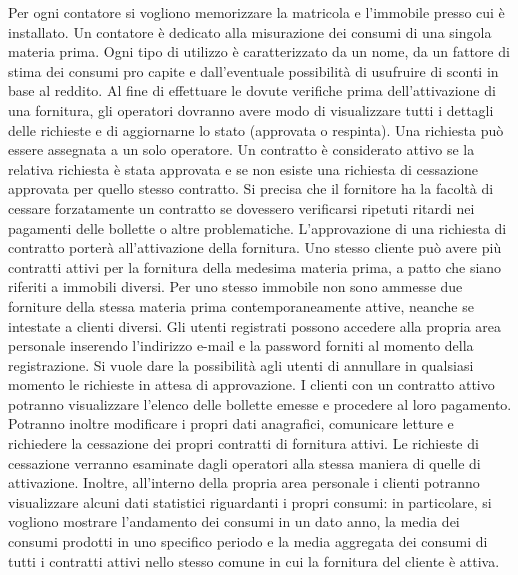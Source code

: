 \documentclass[a4paper,12pt]{report}
\begin{document}
\begin{mdframed}
\newline
Per ogni contatore si vogliono memorizzare la matricola e l'immobile presso cui è installato. Un contatore è dedicato alla misurazione dei consumi di una singola materia prima.
\newline
Ogni tipo di utilizzo è caratterizzato da un nome, da un fattore di stima dei consumi pro capite e dall'eventuale possibilità di usufruire di sconti in base al reddito.
\newline
Al fine di effettuare le dovute verifiche prima dell'attivazione di una fornitura, gli operatori dovranno avere modo di visualizzare tutti i dettagli delle richieste e di aggiornarne lo stato (approvata o respinta). Una richiesta può essere assegnata a un solo operatore. Un contratto è considerato attivo se la relativa richiesta è stata approvata e se non esiste una richiesta di cessazione approvata per quello stesso contratto. Si precisa che il fornitore ha la facoltà di cessare forzatamente un contratto se dovessero verificarsi ripetuti ritardi nei pagamenti delle bollette o altre problematiche.
\newline
L'approvazione di una richiesta di contratto porterà all'attivazione della fornitura. Uno stesso cliente può avere più contratti attivi per la fornitura della medesima materia prima, a patto che siano riferiti a immobili diversi. Per uno stesso immobile non sono ammesse due forniture della stessa materia prima contemporaneamente attive, neanche se intestate a clienti diversi. 
\newline
Gli utenti registrati possono accedere alla propria area personale inserendo l'indirizzo e-mail e la password forniti al momento della registrazione. Si vuole dare la possibilità agli utenti di annullare in qualsiasi momento le richieste in attesa di approvazione. I clienti con un contratto attivo potranno visualizzare l'elenco delle bollette emesse e procedere al loro pagamento. Potranno inoltre modificare i propri dati anagrafici, comunicare letture e richiedere la cessazione dei propri contratti di fornitura attivi. Le richieste di cessazione verranno esaminate dagli operatori alla stessa maniera di quelle di attivazione.
\newline
Inoltre, all'interno della propria area personale i clienti potranno visualizzare alcuni dati statistici riguardanti i propri consumi: in particolare, si vogliono mostrare l'andamento dei consumi in un dato anno, la media dei consumi prodotti in uno specifico periodo e la media aggregata dei consumi di tutti i contratti attivi nello stesso comune in cui la fornitura del cliente è attiva.

\end{mdframed}
\end{document}
